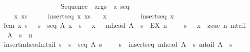 \begin{isabellebody}
\isanewline
\ \ \ \ \ \ \ \ \ \ \ \ \ \ \isanewline
{}\isamarkupfalse%
\isanewline
\ \ {\isachardoublequoteopen}{\isacharat}Sequence{\isachardoublequoteclose}\ {\isacharcolon}{\isacharcolon}\ {\isachardoublequoteopen}args\ {\isacharequal}{\isachargreater}\ {\isacharprime}a\ seq\ {\isachardoublequoteclose}\ \ \ \ \ \ \ \ \ \ \ \ \ \ \ \ \ \ \ {\isacharparenleft}{\isachardoublequoteopen}{\isacharpercent}{\isacharless}{\isacharparenleft}{\isacharunderscore}{\isacharparenright}{\isacharpercent}{\isachargreater}{\isachardoublequoteclose}{\isacharparenright}\isanewline
\isanewline
{}\isamarkupfalse%
\isanewline
\ \ {\isachardoublequoteopen}{\isacharpercent}{\isacharless}\ x{\isacharcomma}\ xs\ {\isacharpercent}{\isachargreater}{\isachardoublequoteclose}\ \ \ \ {\isacharequal}{\isacharequal}\ {\isachardoublequoteopen}insertseq\ x\ {\isacharpercent}{\isacharless}xs{\isacharpercent}{\isachargreater}{\isachardoublequoteclose}\isanewline
\ \ {\isachardoublequoteopen}{\isacharpercent}{\isacharless}\ x\ {\isacharpercent}{\isachargreater}{\isachardoublequoteclose}\ \ \ \ \ \ \ \ {\isacharequal}{\isacharequal}\ {\isachardoublequoteopen}insertseq\ x\ {\isacharpercent}{\isacharless}{\isacharpercent}{\isachargreater}{\isachardoublequoteclose}\isanewline
\isanewline
\isanewline
\isanewline
{}\isamarkupfalse%
\isanewline
\isanewline
lem{}{\isacharcolon}\ {\isachardoublequoteopen}{\isacharbang}{\isacharbang}x\ s{\isachardot}\ \ {\isacharbrackleft}{\isacharbar}\ s\ {\isacharcolon}\ seq\ A{\isacharsemicolon}\ x\ {\isacharcolon}\ s\ {\isacharbar}{\isacharbrackright}\ {\isacharequal}{\isacharequal}{\isachargreater}\ x\ {\isacharequal}\ {\isacharparenleft}{}{\isacharcomma}\ mhead\ A\ {\isacharpercent}{\isacharcircum}\ s{\isacharparenright}\ {\isacharbar}\ {\isacharparenleft}EX\ n\ {\isacharcolon}\ {}\ {\isachardot}{\isachardot}\ {\isacharhash}\ s\ {\isacharminus}\ {}{\isachardot}\ x\ {\isacharequal}\ {\isacharparenleft}zsuc\ n{\isacharcomma}\ mtail\ A\ {\isacharpercent}{\isacharcircum}\ s\ {\isacharpercent}{\isacharcircum}\ n{\isacharparenright}{\isacharparenright}{\isachardoublequoteclose}\isanewline
insert{\isacharunderscore}mhead{\isacharunderscore}mtail{\isacharcolon}\ {\isachardoublequoteopen}{\isacharbang}{\isacharbang}s{\isachardot}\ {\isacharbrackleft}{\isacharbar}\ s\ {\isacharcolon}\ seq\ A{\isacharsemicolon}\ s\ {\isachartilde}{\isacharequal}\ {\isacharpercent}{\isacharless}{\isacharpercent}{\isachargreater}\ {\isacharbar}{\isacharbrackright}\ {\isacharequal}{\isacharequal}{\isachargreater}\ s\ {\isacharequal}\ insertseq\ {\isacharparenleft}mhead\ A\ {\isacharpercent}{\isacharcircum}\ s{\isacharparenright}\ {\isacharparenleft}mtail\ A\ {\isacharpercent}{\isacharcircum}\ s{\isacharparenright}{\isachardoublequoteclose}\isanewline

\end{isabellebody}
